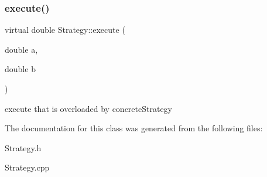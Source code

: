 \subsubsection{\texorpdfstring{execute()}{execute()}}
{\footnotesize\ttfamily virtual double Strategy\+::execute (\begin{DoxyParamCaption}\item[{double}]{a,  }\item[{double}]{b }\end{DoxyParamCaption})\hspace{0.3cm}{\ttfamily [pure virtual]}}

execute that is overloaded by concrete\+Strategy 

The documentation for this class was generated from the following files\+:\begin{DoxyCompactItemize}
\item 
Strategy.\+h\item 
Strategy.\+cpp\end{DoxyCompactItemize}
